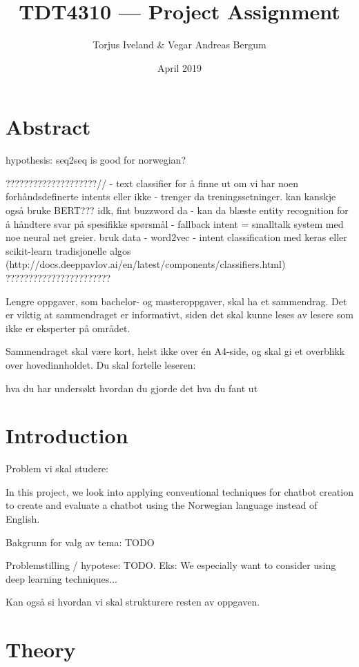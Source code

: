 \documentclass{article}
\title{TDT4310 --- Project Assignment}
\author{Torjus Iveland \& Vegar Andreas Bergum}
\date{April 2019}
\begin{document}
\maketitle

\section{Abstract}

hypothesis: seq2seq is good for norwegian?


????????????????????//
- text classifier for å finne ut om vi har noen forhåndsdefinerte intents eller ikke
- trenger da treningssetninger. kan kanskje også bruke BERT??? idk, fint buzzword da
- kan da blæste entity recognition for å håndtere svar på spesifikke spørsmål
- fallback intent = smalltalk system med noe neural net greier. bruk data 
- word2vec
- intent classification med keras eller scikit-learn tradisjonelle algos (http://docs.deeppavlov.ai/en/latest/components/classifiers.html)
???????????????????????










Lengre oppgaver, som bachelor- og masteroppgaver, skal ha et sammendrag. Det er viktig at sammendraget er informativt, siden det skal kunne leses av lesere som ikke er eksperter på området.

Sammendraget skal være kort, helst ikke over én A4-side, og skal gi et overblikk over hovedinnholdet. Du skal fortelle leseren:

hva du har undersøkt
hvordan du gjorde det
hva du fant ut

\section{Introduction}

Problem vi skal studere:

In this project, we look into applying conventional techniques for chatbot creation to create and evaluate a chatbot using the Norwegian language instead of English.


Bakgrunn for valg av tema: TODO

Problemstilling / hypotese: TODO. Eks: We especially want to consider using deep learning techniques...

Kan også si hvordan vi skal strukturere resten av oppgaven.

\section{Theory}
\end{document}
